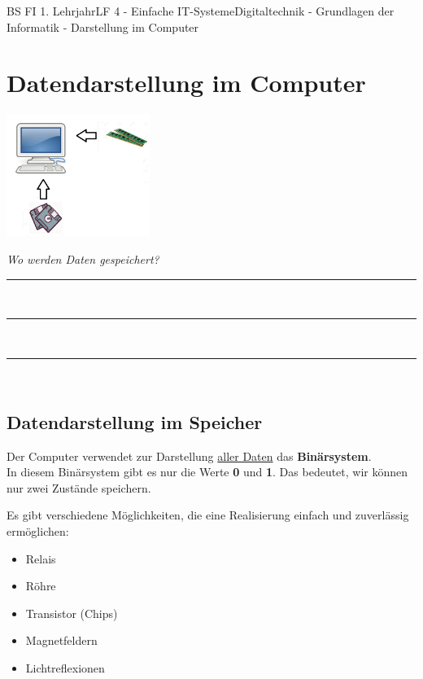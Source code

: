 \documentclass[11pt,twocolumn,oneside,openany,headings=optiontotoc,11pt,numbers=noenddot]{article}
\begin{document}
	\begin{worksheet}{BS FI 1. Lehrjahr}{LF 4 - Einfache IT-Systeme}{Digitaltechnik - Grundlagen der Informatik - Darstellung im Computer}
		\section{Datendarstellung im Computer}
		\begin{center}
			\includegraphics[width=0.35\textwidth]{../99_Bilder/overview.png}
		\end{center}
		
		\textit{Wo werden Daten gespeichert?}\\
		\par
		\rule{0.43\textwidth}{0.1pt}\\
		\par
		\rule{0.43\textwidth}{0.1pt}\\
		\par
		\rule{0.43\textwidth}{0.1pt}\\
		\subsection{Datendarstellung im Speicher} Der Computer verwendet zur Darstellung \underline{aller Daten} das \textbf{Binärsystem}.\\
		In diesem Binärsystem gibt es nur die Werte \textbf{0} und \textbf{1}. Das bedeutet, wir können nur zwei Zustände speichern.\\
		\par\noindent
		Es gibt verschiedene Möglichkeiten, die eine Realisierung einfach und zuverlässig ermöglichen:
		\begin{itemize}
			\item Relais
			\item Röhre
			\item Transistor (Chips)
			\item Magnetfeldern
			\item Lichtreflexionen
		\end{itemize}

\end{worksheet}
\end{document}
